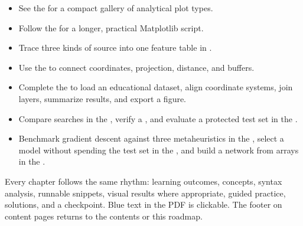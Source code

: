 \begin{itemize}
    \item See the  for a
          compact gallery of analytical plot types.
    \item Follow the  for a longer, practical Matplotlib script.
    \item Trace three kinds of source into one feature table in
          .
    \item Use the  to
          connect coordinates, projection, distance, and buffers.
    \item Complete the  to load an educational dataset, align coordinate
          systems, join layers, summarize results, and export a figure.
    \item Compare searches in the
          , verify a
          , and
          evaluate a protected test set in the
          .
    \item Benchmark gradient descent against three metaheuristics in the
          , select
          a model without spending the test set in the
          , and build a
          network from arrays in the
          .
\end{itemize}

Every chapter follows the same rhythm: learning outcomes, concepts, syntax
analysis, runnable snippets, visual results where appropriate, guided practice,
solutions, and a checkpoint. Blue text in the PDF is clickable. The footer on
content pages returns to the contents or this roadmap.
